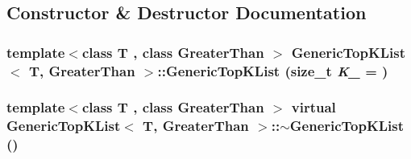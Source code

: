 \subsection{Constructor \& Destructor Documentation}
\hypertarget{class_generic_top_k_list_a18a193d1dfb006dcf3bdbde105a8838a}{
\subsubsection[{GenericTopKList}]{\setlength{\rightskip}{0pt plus 5cm}template$<$class T , class GreaterThan $>$ {\bf GenericTopKList}$<$ T, GreaterThan $>$::{\bf GenericTopKList} (size\_\-t {\em K\_\-} = {})}}
\label{class_generic_top_k_list_a18a193d1dfb006dcf3bdbde105a8838a}
\hypertarget{class_generic_top_k_list_aed78c2fb73928c49c69deec86d8233d2}{
\subsubsection[{$\sim$GenericTopKList}]{\setlength{\rightskip}{0pt plus 5cm}template$<$class T , class GreaterThan $>$ virtual {\bf GenericTopKList}$<$ T, GreaterThan $>$::$\sim${\bf GenericTopKList} ()}}
\label{class_generic_top_k_list_aed78c2fb73928c49c69deec86d8233d2}


